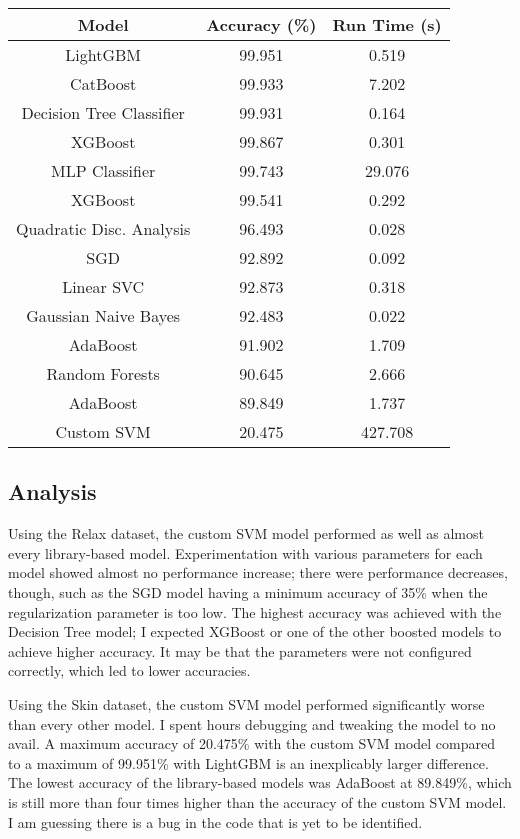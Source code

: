 \documentclass[letterpaper]{article}
\begin{document}
\begin{center}
\begin{tabular}{|c c c|}
 \hline
 Model & Accuracy (\%) & Run Time (s) \\
 \hline
 LightGBM                 & 99.951 &  0.519 \\
 \hline
 CatBoost                 & 99.933 &  7.202 \\
 \hline
 Decision Tree Classifier & 99.931 &  0.164 \\
 \hline
 XGBoost                  & 99.867 &  0.301 \\
 \hline
 MLP Classifier           & 99.743 & 29.076 \\
 \hline
 XGBoost                  & 99.541 &  0.292 \\
 \hline
 Quadratic Disc. Analysis & 96.493 &  0.028 \\
 \hline
 SGD                      & 92.892 &  0.092 \\
 \hline
 Linear SVC               & 92.873 &  0.318 \\
 \hline
 Gaussian Naive Bayes     & 92.483 &  0.022 \\
 \hline
 AdaBoost                 & 91.902 &  1.709 \\
 \hline
 Random Forests           & 90.645 &  2.666 \\
 \hline
 AdaBoost                 & 89.849 &  1.737 \\
 \hline
 Custom SVM               & 20.475 & 427.708 \\
 \hline
\end{tabular}
\end{center}

\subsection{Analysis}

Using the Relax dataset, the custom SVM model performed as well as almost every library-based model. Experimentation with various parameters for each model showed almost no performance increase; there were performance decreases, though, such as the SGD model having a minimum accuracy of 35\% when the regularization parameter is too low. The highest accuracy was achieved with the Decision Tree model; I expected XGBoost or one of the other boosted models to achieve higher accuracy. It may be that the parameters were not configured correctly, which led to lower accuracies.

Using the Skin dataset, the custom SVM model performed significantly worse than every other model. I spent hours debugging and tweaking the model to no avail. A maximum accuracy of 20.475\% with the custom SVM model compared to a maximum of 99.951\% with LightGBM is an inexplicably larger difference. The lowest accuracy of the library-based models was AdaBoost at 89.849\%, which is still more than four times higher than the accuracy of the custom SVM model. I am guessing there is a bug in the code that is yet to be identified.
\end{document}
